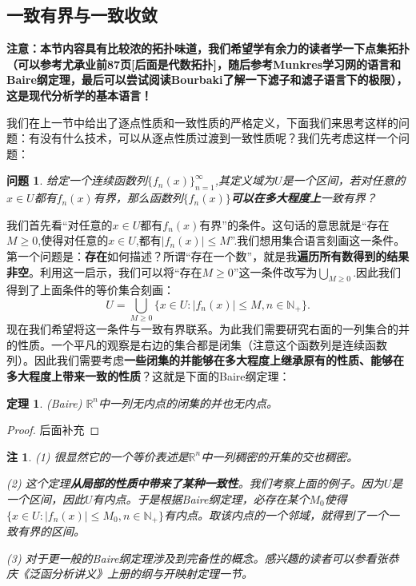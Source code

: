 \documentclass{article}
\newtheorem{theorem}{定理}[subsection]
\newtheorem{note}{注}[subsection]
\newtheorem{question}{问题}[subsection]
\begin{document}
\subsection{一致有界与一致收敛}
\textbf{注意：本节内容具有比较浓的{\color{red}拓扑味道}，我们希望学有余力的读者学一下点集拓扑（可以参考尤承业前87页[后面是代数拓扑]，随后参考Munkres学习网的语言和Baire纲定理，最后可以尝试阅读Bourbaki了解一下滤子和滤子语言下的极限），这是现代分析学的基本语言！}\par
我们在上一节中给出了逐点性质和一致性质的严格定义，下面我们来思考这样的问题：有没有什么技术，可以从逐点性质过渡到一致性质呢？我们先考虑这样一个问题：
\begin{question}
给定一个连续函数列$\{f_n(x)\}_{n=1}^\infty$,其定义域为$U$是一个区间，若对任意的$x\in U$都有$f_n(x)$有界，那么函数列$\{f_n(x)\}$\textbf{可以在多大程度上}一致有界？
\end{question}
我们首先看“对任意的$x\in U$都有$f_n(x)$有界”的条件。这句话的意思就是“存在$M\ge 0$,使得对任意的$x\in U$,都有$|f_n(x)|\le M$”.我们想用集合语言刻画这一条件。第一个问题是：\textbf{存在}如何描述？所谓“存在一个数”，就是我\textbf{遍历所有数得到的结果非空}。利用这一启示，我们可以将“存在$M\ge 0$”这一条件改写为$\bigcup_{M\ge 0}$.因此我们得到了上面条件的等价集合刻画：
$$U=\bigcup_{M\ge 0}\{x\in U:|f_n(x)|\le M,n\in\mathbb{N}_+\}.$$
现在我们希望将这一条件与一致有界联系。为此我们需要研究右面的一列集合的并的性质。一个平凡的观察是右边的集合都是闭集（注意这个函数列是连续函数列）。因此我们需要考虑\textbf{一些闭集的并能够在多大程度上继承原有的性质、能够在多大程度上带来一致的性质}？这就是下面的Baire纲定理：
\begin{theorem}(Baire)
$\mathbb{R}^n$中一列无内点的闭集的并也无内点。
\end{theorem}
\begin{proof}
后面补充
\end{proof}
\begin{note}
(1) 很显然它的一个等价表述是$\mathbb{R}^n$中一列稠密的开集的交也稠密。\par
(2) 这个定理\textbf{从局部的性质中带来了某种一致性}。我们考察上面的例子。因为$U$是一个区间，因此$U$有内点。于是根据Baire纲定理，必存在某个$M_0$使得$\{x\in U:|f_n(x)|\le M_0,n\in\mathbb{N}_+\}$有内点。取该内点的一个邻域，就得到了一个一致有界的区间。\par
(3) 对于更一般的Baire纲定理涉及到完备性的概念。感兴趣的读者可以参看张恭庆《泛函分析讲义》上册的纲与开映射定理一节。
\end{note}
\end{document}
